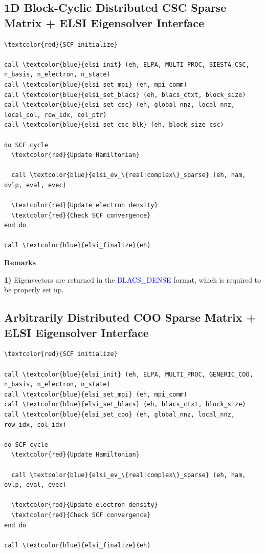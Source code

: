 \documentclass{report}
\begin{document}
\subsection*{1D Block-Cyclic Distributed CSC Sparse Matrix + ELSI Eigensolver Interface}
\begin{tcolorbox}
\begin{Verbatim}[commandchars=\\\{\}]
\textcolor{red}{SCF initialize}

call \textcolor{blue}{elsi_init} (eh, ELPA, MULTI_PROC, SIESTA_CSC, n_basis, n_electron, n_state)
call \textcolor{blue}{elsi_set_mpi} (eh, mpi_comm)
call \textcolor{blue}{elsi_set_blacs} (eh, blacs_ctxt, block_size)
call \textcolor{blue}{elsi_set_csc} (eh, global_nnz, local_nnz, local_col, row_idx, col_ptr)
call \textcolor{blue}{elsi_set_csc_blk} (eh, block_size_csc)

do SCF cycle
  \textcolor{red}{Update Hamiltonian}

  call \textcolor{blue}{elsi_ev_\{real|complex\}_sparse} (eh, ham, ovlp, eval, evec)

  \textcolor{red}{Update electron density}
  \textcolor{red}{Check SCF convergence}
end do

call \textcolor{blue}{elsi_finalize}(eh)
\end{Verbatim}
\end{tcolorbox}

\textbf{Remarks}

\textbf{1)} Eigenvectors are returned in the \textcolor{blue}{BLACS\_DENSE} format, which is required to be properly set up.

\subsection*{Arbitrarily Distributed COO Sparse Matrix + ELSI Eigensolver Interface}
\begin{tcolorbox}
\begin{Verbatim}[commandchars=\\\{\}]
\textcolor{red}{SCF initialize}

call \textcolor{blue}{elsi_init} (eh, ELPA, MULTI_PROC, GENERIC_COO, n_basis, n_electron, n_state)
call \textcolor{blue}{elsi_set_mpi} (eh, mpi_comm)
call \textcolor{blue}{elsi_set_blacs} (eh, blacs_ctxt, block_size)
call \textcolor{blue}{elsi_set_coo} (eh, global_nnz, local_nnz, row_idx, col_idx)

do SCF cycle
  \textcolor{red}{Update Hamiltonian}

  call \textcolor{blue}{elsi_ev_\{real|complex\}_sparse} (eh, ham, ovlp, eval, evec)

  \textcolor{red}{Update electron density}
  \textcolor{red}{Check SCF convergence}
end do

call \textcolor{blue}{elsi_finalize}(eh)
\end{Verbatim}
\end{tcolorbox}
\end{document}
